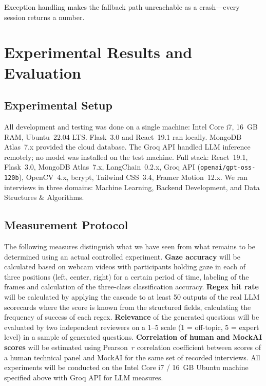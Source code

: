 \documentclass[conference]{IEEEtran}
\begin{document}
Exception handling makes the fallback path unreachable as a
crash---every session returns a number.

\section{Experimental Results and Evaluation}

\subsection{Experimental Setup}

All development and testing was done on a single machine: Intel Core
i7, 16~GB RAM, Ubuntu~22.04 LTS. Flask~3.0 and React~19.1 ran
locally. MongoDB Atlas~7.x provided the cloud database. The Groq API
handled LLM inference remotely; no model was installed on the test
machine. Full stack: React~19.1, Flask~3.0, MongoDB Atlas~7.x,
LangChain~0.2.x, Groq API (\texttt{openai/gpt-oss-120b}), OpenCV~4.x,
bcrypt, Tailwind CSS~3.4, Framer Motion~12.x. We ran interviews in
three domains: Machine Learning, Backend Development, and Data
Structures \& Algorithms.

\subsection{Measurement Protocol}
\label{sec:meas}

The following measures distinguish what we have seen from what remains
to be determined using an actual controlled experiment.
\textbf{Gaze accuracy} will be calculated based on webcam videos with
participants holding gaze in each of three positions (left, center,
right) for a certain period of time, labeling of the frames and
calculation of the three-class classification accuracy.
\textbf{Regex hit rate} will be calculated by applying the cascade to
at least 50 outputs of the real LLM scorecards where the score is
known from the structured fields, calculating the frequency of success
of each regex.
\textbf{Relevance} of the generated questions will be evaluated by two
independent reviewers on a 1--5 scale (1 = off-topic, 5 = expert
level) in a sample of generated questions.
\textbf{Correlation of human and MockAI scores} will be estimated
using Pearson~$r$ correlation coefficient between scores of a human
technical panel and MockAI for the same set of recorded interviews. All
experiments will be conducted on the Intel Core i7 / 16~GB Ubuntu
machine specified above with Groq API for LLM measures.
\end{document}
